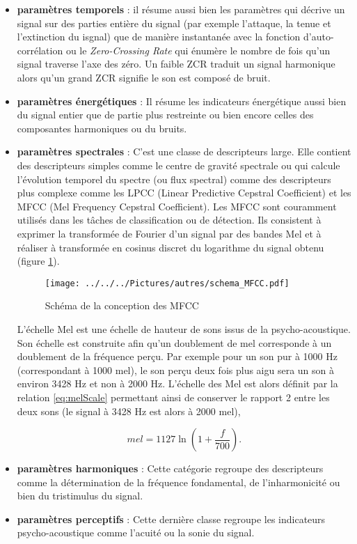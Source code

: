 \begin{itemize}
\item \textbf{paramètres temporels} : il résume aussi bien les paramètres qui décrive un signal sur des parties entière du signal (par exemple l'attaque, la tenue et l'extinction du isgnal) que de manière instantanée avec la fonction d'auto-corrélation ou le \textit{Zero-Crossing Rate} qui énumère le nombre de fois qu'un signal traverse l'axe des zéro. Un faible ZCR traduit un signal harmonique alors qu'un grand ZCR signifie le son est composé de bruit. 

\item \textbf{paramètres énergétiques} : Il résume les indicateurs énergétique aussi bien du signal entier que de partie plus restreinte ou bien encore celles des composantes harmoniques ou du bruits.

\item \textbf{paramètres spectrales} : C'est une classe de descripteurs large. Elle contient des descripteurs simples comme le centre de gravité spectrale ou qui calcule l'évolution temporel du spectre (ou flux spectral) comme des descripteurs plus complexe comme les LPCC (Linear Predictive Cepstral Coefficient) et les MFCC (Mel Frequency Cepstral Coefficient). Les MFCC sont couramment utilisés dans les tâches de classification ou de détection. Ils consistent à exprimer la transformée de Fourier d'un signal par des bandes Mel et à réaliser à transformée en cosinus discret du logarithme du signal obtenu (figure \ref{fig:schema_mfcc}).

\begin{figure}[h]
\centering
\texttt{[image: ../../../Pictures/autres/schema\_MFCC.pdf]}
\caption{Schéma de la conception des MFCC}
\label{fig:schema_mfcc}
\end{figure}

L'échelle Mel est une échelle de hauteur de sons issus de la psycho-acoustique. Son échelle est construite afin qu'un doublement de mel corresponde à un doublement de la fréquence perçu. Par exemple pour un son pur à 1000 Hz (correspondant à 1000 mel), le son perçu deux fois plus aigu sera un son à environ 3428 Hz et non à 2000 Hz. L'échelle des Mel est alors définit par la relation \ref{eq:melScale} permettant ainsi de conserver le rapport 2 entre les deux sons (le signal à 3428 Hz est alors à 2000 mel),

\begin{equation}\label{eq:melScale}
mel = 1127 \ln\left(1+\frac{f}{700}\right).
\end{equation}


\item \textbf{paramètres harmoniques} : Cette catégorie regroupe des descripteurs comme la détermination de la fréquence fondamental, de  l'inharmonicité ou bien du tristimulus du signal.

\item \textbf{paramètres perceptifs} : Cette dernière classe regroupe les indicateurs psycho-acoustique comme l'acuité ou la sonie du signal.\\
\end{itemize}


